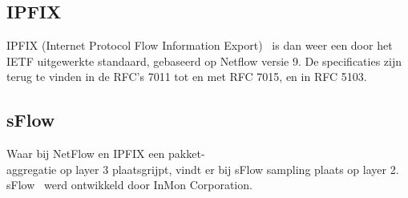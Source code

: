 \subsection{IPFIX}
IPFIX (Internet Protocol Flow Information Export)~\autocite{Aitken2013} is dan weer een door het IETF uitgewerkte standaard, gebaseerd op Netflow versie 9. De specificaties zijn terug te vinden in de RFC’s 7011 tot en met RFC 7015, en in RFC 5103.

\subsection{sFlow}
Waar bij NetFlow en IPFIX een pakket-\\aggregatie op layer 3 plaatsgrijpt, vindt er bij sFlow sampling plaats op layer 2. sFlow~\autocite{Phaal2004} werd ontwikkeld door InMon Corporation.
